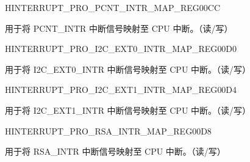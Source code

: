 \begin{register}{H}{INTERRUPT\_PRO\_PCNT\_INTR\_MAP\_REG}{\hexprefix{}00CC}\label{regdesc:INTERRUPTPROPCNTINTRMAPREG}
%
%
\regnewline%
\begin{regdesc}\begin{reglist}
\label{fielddesc:INTERRUPTPROPCNTINTRMAP}\item [INTERRUPT\_PRO\_PCNT\_INTR\_MAP] 用于将 PCNT\_INTR 中断信号映射至 CPU 中断。（读/写）
\end{reglist}\end{regdesc}
\end{register}


\begin{register}{H}{INTERRUPT\_PRO\_I2C\_EXT0\_INTR\_MAP\_REG}{\hexprefix{}00D0}\label{regdesc:INTERRUPTPROI2CEXT0INTRMAPREG}
%
%
\regnewline%
\begin{regdesc}\begin{reglist}
\label{fielddesc:INTERRUPTPROI2CEXT0INTRMAP}\item [INTERRUPT\_PRO\_I2C\_EXT0\_INTR\_MAP] 用于将 I2C\_EXT0\_INTR 中断信号映射至 CPU 中断。（读/写）
\end{reglist}\end{regdesc}
\end{register}


\begin{register}{H}{INTERRUPT\_PRO\_I2C\_EXT1\_INTR\_MAP\_REG}{\hexprefix{}00D4}\label{regdesc:INTERRUPTPROI2CEXT1INTRMAPREG}
%
%
\regnewline%
\begin{regdesc}\begin{reglist}
\label{fielddesc:INTERRUPTPROI2CEXT1INTRMAP}\item [INTERRUPT\_PRO\_I2C\_EXT1\_INTR\_MAP] 用于将 I2C\_EXT1\_INTR 中断信号映射至 CPU 中断。（读/写）
\end{reglist}\end{regdesc}
\end{register}


\begin{register}{H}{INTERRUPT\_PRO\_RSA\_INTR\_MAP\_REG}{\hexprefix{}00D8}\label{regdesc:INTERRUPTPRORSAINTRMAPREG}
%
%
\regnewline%
\begin{regdesc}\begin{reglist}
\label{fielddesc:INTERRUPTPRORSAINTRMAP}\item [INTERRUPT\_PRO\_RSA\_INTR\_MAP] 用于将 RSA\_INTR 中断信号映射至 CPU 中断。（读/写）
\end{reglist}\end{regdesc}
\end{register}


